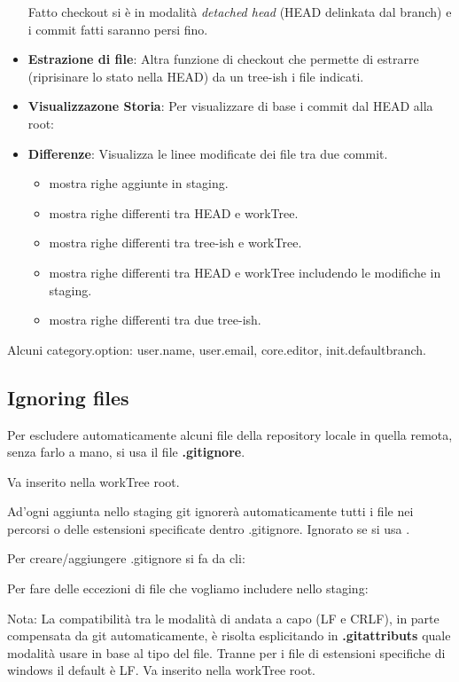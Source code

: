 \begin{itemize}

	Fatto checkout si è in modalità \textit{detached head} (HEAD delinkata dal branch) e i commit fatti saranno persi fino.

	\item \textbf{Estrazione di file}: Altra funzione di checkout che permette di estrarre (riprisinare lo stato nella HEAD) da un tree-ish i file indicati.


	\item \textbf{Visualizzazone Storia}: Per visualizzare di base i commit dal HEAD alla root:


	\item \textbf{Differenze}: Visualizza le linee modificate dei file tra due commit.
	\begin{itemize}
		\item {} mostra righe aggiunte in staging.
		\item {} mostra righe differenti tra HEAD e workTree.
		\item {} mostra righe differenti tra tree-ish e workTree.
		\item {} mostra righe differenti tra HEAD e workTree includendo le modifiche in staging.
		\item {} mostra righe differenti tra due tree-ish.
	\end{itemize}
\end{itemize}

Alcuni category.option: user.name, user.email, core.editor, init.defaultbranch.

\subsection{Ignoring files}
Per escludere automaticamente alcuni file della repository locale in quella remota, senza farlo a mano, si usa il file \textbf{.gitignore}.

Va inserito nella workTree root.

Ad'ogni aggiunta nello staging git ignorerà automaticamente tutti i file nei percorsi o delle estensioni specificate dentro .gitignore. Ignorato se si usa .

Per creare/aggiungere .gitignore si fa da cli:


Per fare delle eccezioni di file che vogliamo includere nello staging:



Nota: La compatibilità tra le modalità di andata a capo (LF e CRLF), in parte compensata da git automaticamente, è risolta esplicitando in \textbf{.gitattributs} quale modalità usare in base al tipo del file. Tranne per i file di estensioni specifiche di windows il default è LF. Va inserito nella workTree root.